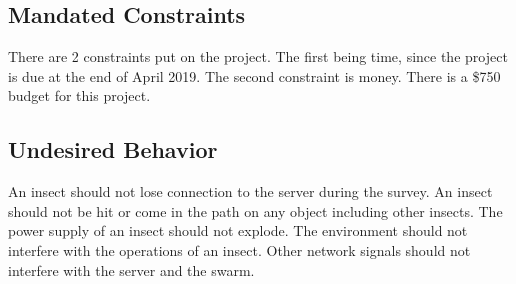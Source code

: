 \documentclass[11pt]{article}
\begin{document}
\subsection{Mandated Constraints}
There are 2 constraints put on the project. The first being time, since the project is due at the end of April 2019. The second constraint is money. There is a \$750 budget for this project.
\subsection{Undesired Behavior}
An insect should not lose connection to the server during the survey. An insect should not be hit or come in the path on any object including other insects. The power supply of an insect should not explode. The environment should not interfere with the operations of an insect. Other network signals should not interfere with the server and the swarm. 
\end{document}
